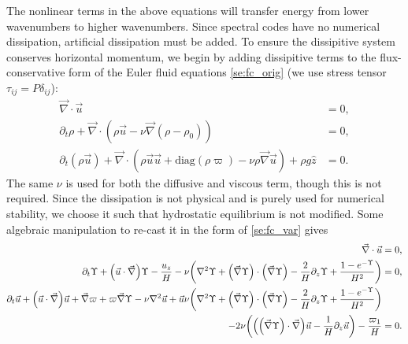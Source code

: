 \documentclass[twocolumn,
        nofootinbib,
        usenames, %
        dvipsnames %
    ]{revtex4-1}%
\DeclarePairedDelimiter\p{\lparen}{\rparen}
\begin{document}
The nonlinear terms in the above equations will transfer energy from lower
wavenumbers to higher wavenumbers. Since spectral codes have no numerical
dissipation, artificial dissipation must be added. To ensure the dissipitive
system conserves horizontal momentum, we begin by adding dissipitive terms to
the flux-conservative form of the Euler fluid equations \autoref{se:fc_orig} (we
use stress tensor $\tau_{ij} = P\delta_{ij}$):
\begin{subequations}
    \begin{align}
        \vec{\nabla} \cdot \vec{u} &= 0,\\
        \partial_t \rho + \vec{\nabla} \cdot (\rho \vec{u} - \nu
            \vec{\nabla}(\rho - \rho_0)) &= 0,\label{eq:visc_cons_mom}\\
        \partial_t (\rho \vec{u}) + \vec{\nabla} \cdot (\rho \vec{u} \vec{u} +
            \mathrm{diag}(\rho \varpi) - \nu \rho \vec{\nabla}\vec{u}) + \rho g
            \hat{z} &= 0.
    \end{align}
\end{subequations}
The same $\nu$ is used for both the diffusive and viscous term, though this is
not required. Since the dissipation is not physical and is purely used for
numerical stability, we choose it such that hydrostatic equilibrium is not
modified. Some algebraic manipulation to re-cast it in the form of
\autoref{se:fc_var} gives
\begin{subequations}
    \begin{align}
        \vec{\nabla} \cdot \vec{u} &= 0,\\
        \partial_t \Upsilon + \p*{\vec{u} \cdot \vec{\nabla}} \Upsilon -
            \frac{u_z}{H} - \nu\p*{\nabla^2 \Upsilon + \p*{\vec{\nabla}
            \Upsilon} \cdot \p*{\vec{\nabla}\Upsilon} - \frac{2}{H}\partial_z
            \Upsilon + \frac{1 - e^{-\Upsilon}}{H^2}} &= 0,\\
        \partial_t \vec{u} + \p*{\vec{u} \cdot \vec{\nabla}}\vec{u} +
            \vec{\nabla} \varpi + \varpi \vec{\nabla} \Upsilon - \nu \nabla^2
            \vec{u} + \vec{u} \nu\p*{\nabla^2 \Upsilon + \p*{\vec{\nabla}
            \Upsilon} \cdot \p*{\vec{\nabla}\Upsilon} - \frac{2}{H}\partial_z
            \Upsilon + \frac{1 - e^{-\Upsilon}}{H^2}}&{}\nonumber\\
        - 2\nu \p*{\p*{\p*{\vec{\nabla}\Upsilon} \cdot \vec{\nabla}}\vec{u} -
            \frac{1}{H}\partial_z \vec{u}} - \frac{\varpi_1}{H} &= 0.
    \end{align}
\end{subequations}
\end{document}
